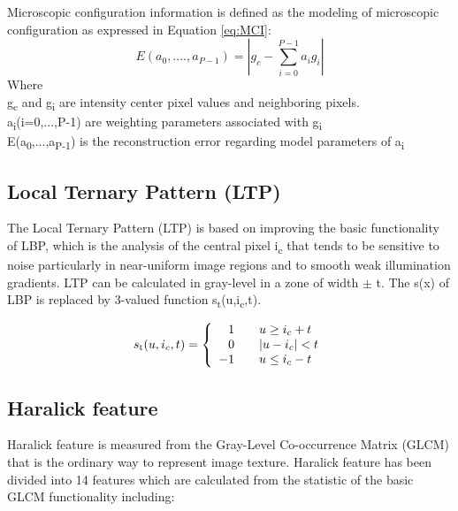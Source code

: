 \documentclass[review]{elsarticle}
\begin{document}
Microscopic configuration information is defined as the modeling of microscopic configuration as expressed in Equation \ref{eq:MCI}: 
\begin{equation}
E(a_0,....,a_{P-1}) = |g_c - \sum_{i=0}^{P-1} a_ig_i|
\label{eq:MCI}
\end{equation}
Where \\
g\textsubscript{c} and g\textsubscript{i} are intensity center pixel values and neighboring pixels.\\
a\textsubscript{i}(i=0,...,P-1) are weighting parameters associated with g\textsubscript{i} \\
E(a\textsubscript{0},...,a\textsubscript{P-1}) is the reconstruction error regarding model parameters of a\textsubscript{i}
\subsection{Local Ternary Pattern (LTP)}
\label{subsec:LTP}
The Local Ternary Pattern (LTP) is based on improving the basic functionality of LBP, which is the analysis of the central pixel i\textsubscript{c} that tends to be sensitive to noise particularly in near-uniform image regions and to smooth weak illumination gradients. LTP can be calculated in gray-level in a zone of width $\pm$ t. The s(x) of LBP is replaced by 3-valued function s\textsubscript{t}(u,i\textsubscript{c},t).

\begin{equation}
s\textsubscript{t}(u,i_c,t) = \left\{ \begin{array}{rcl}
1 & 
& u\geq i_c+t \\ 0 &  & |u - i_c| <t \\
-1 & & u \leq i_c -t

\end{array}\right.
\end{equation}

 \subsection{Haralick feature}
\label{subsec:haralick}

Haralick feature is measured from the Gray-Level Co-occurrence Matrix (GLCM) that is the ordinary way to represent image texture. Haralick feature has been divided into 14 features which are calculated from the statistic of the basic GLCM functionality including: 
\end{document}
